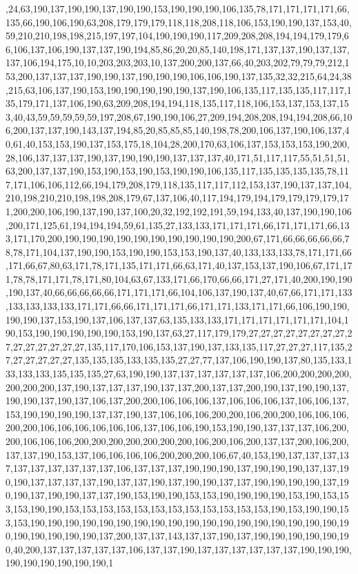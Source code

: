 ,24,63,190,137,190,190,137,190,190,153,190,190,190,106,135,78,171,171,171,171,66,135,66,190,106,190,63,208,179,179,179,118,118,208,118,106,153,190,190,137,153,40,59,210,210,198,198,215,197,197,104,190,190,190,117,209,208,208,194,194,179,179,66,106,137,106,190,137,137,190,194,85,86,20,20,85,140,198,171,137,137,190,137,137,137,106,194,175,10,10,203,203,203,10,137,200,200,137,66,40,203,202,79,79,79,212,153,200,137,137,137,190,190,137,190,190,190,106,106,190,137,135,32,32,215,64,24,38,215,63,106,137,190,153,190,190,190,190,190,137,190,106,135,117,135,135,117,117,135,179,171,137,106,190,63,209,208,194,194,118,135,117,118,106,153,137,153,137,153,40,43,59,59,59,59,59,197,208,67,190,190,106,27,209,194,208,208,194,194,208,66,106,200,137,137,190,143,137,194,85,20,85,85,85,140,198,78,200,106,137,190,106,137,40,61,40,153,153,190,137,153,175,18,104,28,200,170,63,106,137,153,153,153,190,200,28,106,137,137,137,190,137,190,190,190,137,137,137,40,171,51,117,117,55,51,51,51,63,200,137,137,190,153,190,153,190,153,190,190,106,135,117,135,135,135,135,78,117,171,106,106,112,66,194,179,208,179,118,135,117,117,112,153,137,190,137,137,104,210,198,210,210,198,198,208,179,67,137,106,40,117,194,179,194,179,179,179,179,171,200,200,106,190,137,190,137,100,20,32,192,192,191,59,194,133,40,137,190,190,106,200,171,125,61,194,194,194,59,61,135,27,133,133,171,171,171,66,171,171,171,66,133,171,170,200,190,190,190,190,190,190,190,190,190,190,200,67,171,66,66,66,66,66,78,78,171,104,137,190,190,153,190,190,153,153,190,137,40,133,133,133,78,171,171,66,171,66,67,80,63,171,78,171,135,171,171,66,63,171,40,137,153,137,190,106,67,171,171,78,78,171,171,78,171,80,104,63,67,133,171,66,170,66,66,171,27,171,40,200,190,190,190,137,40,66,66,66,66,66,171,171,171,66,104,106,137,190,137,40,67,66,171,171,133,133,133,133,133,171,171,66,66,171,171,171,66,171,171,133,171,171,66,106,190,190,190,190,137,153,190,137,106,137,137,63,135,133,133,171,171,171,171,171,171,104,190,153,190,190,190,190,190,153,190,137,63,27,117,179,179,27,27,27,27,27,27,27,27,27,27,27,27,27,27,27,135,117,170,106,153,137,190,137,133,135,117,27,27,27,117,135,27,27,27,27,27,27,135,135,135,133,135,135,27,27,77,137,106,190,190,137,80,135,133,133,133,133,135,135,135,27,63,190,190,137,137,137,137,137,137,106,200,200,200,200,200,200,200,137,190,137,137,137,190,137,137,200,137,137,200,190,137,190,190,137,190,190,137,190,137,106,137,200,200,106,106,106,137,106,106,106,137,106,106,137,153,190,190,190,190,137,137,190,137,106,106,106,200,200,106,200,200,106,106,106,200,200,106,106,106,106,106,106,137,106,106,190,153,190,190,137,137,137,106,200,200,106,106,106,200,200,200,200,200,200,200,106,200,106,200,137,137,200,106,200,137,137,190,153,137,106,106,106,106,200,200,200,106,67,40,153,190,137,137,137,137,137,137,137,137,137,137,106,137,137,137,190,190,190,137,190,190,190,137,137,190,190,137,137,137,137,190,137,137,190,137,190,190,137,137,190,190,190,190,137,190,190,137,190,190,137,137,190,153,190,190,153,153,190,190,190,190,153,190,153,153,153,190,190,153,153,153,153,153,153,153,153,153,153,153,153,190,153,190,190,153,153,190,190,190,190,190,190,190,190,190,190,190,190,190,190,190,190,190,190,190,190,190,190,190,190,137,200,137,137,143,137,137,190,137,190,190,190,190,190,190,40,200,137,137,137,137,137,106,137,137,190,137,137,137,137,137,137,190,190,190,190,190,190,190,190,190,1